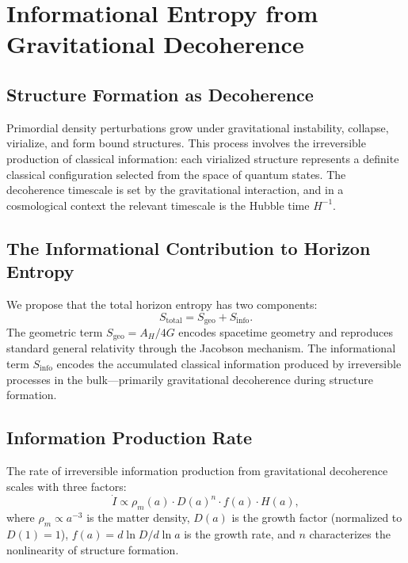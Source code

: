 \documentclass[11pt]{article}
\begin{document}
\section{Informational Entropy from Gravitational Decoherence}
\label{sec:sinfo}

\subsection{Structure Formation as Decoherence}

Primordial density perturbations grow under gravitational instability,
collapse, virialize, and form bound structures.  This process involves the
irreversible production of classical information: each virialized structure
represents a definite classical configuration selected from the space of
quantum states.  The decoherence timescale is set by the gravitational
interaction, and in a cosmological context the relevant timescale is the
Hubble time $H^{-1}$.

\subsection{The Informational Contribution to Horizon Entropy}

We propose that the total horizon entropy has two components:
\begin{equation}
S_\mathrm{total} = S_\mathrm{geo} + S_\mathrm{info}.
\label{eq:Stotal}
\end{equation}
The geometric term $S_\mathrm{geo} = A_H/4G$ encodes spacetime geometry and
reproduces standard general relativity through the Jacobson mechanism.  The
informational term $S_\mathrm{info}$ encodes the accumulated classical
information produced by irreversible processes in the bulk---primarily
gravitational decoherence during structure formation.

\subsection{Information Production Rate}

The rate of irreversible information production from gravitational
decoherence scales with three factors:
\begin{equation}
\dot{I} \propto \rho_m(a)\cdot D(a)^n \cdot f(a) \cdot H(a),
\label{eq:Idot}
\end{equation}
where $\rho_m \propto a^{-3}$ is the matter density, $D(a)$ is the growth
factor (normalized to $D(1) = 1$), $f(a) = d\ln D/d\ln a$ is the growth
rate, and $n$ characterizes the nonlinearity of structure formation.
\end{document}
